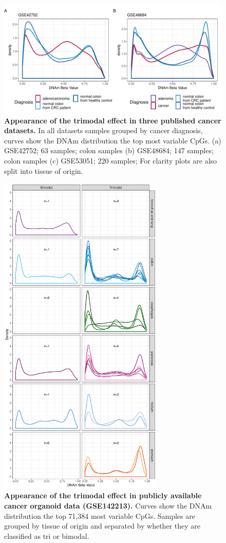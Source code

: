 \documentclass[a4paper]{article}
\begin{document}
\begin{figure}
\includegraphics[width=1\textwidth]{../figs/cancer_public_same_variable_cpg_num.pdf}
\caption{\textbf{Appearance of the trimodal effect in three published cancer datasets.} In all datasets samples grouped by cancer diagnosis, curves show the DNAm distribution the top most variable CpGs. (a) GSE42752; 63 samples; colon samples (b) GSE48684; 147 samples; colon samples (c) GSE53051; 220 samples; For clarity plots are also split into tissue of origin. }
\end{figure}


\begin{figure}
\includegraphics[width=0.7\textwidth]{../figs/GSE144213_variable_CpGs.pdf}
\caption{\textbf{Appearance of the trimodal effect in publicly available cancer organoid data (GSE142213).} Curves show the DNAm distribution the top 71,384 most variable CpGs. Samples are grouped by tissue of origin and separated by whether they are classified as tri or bimodal. }
\end{figure}
\end{document}

